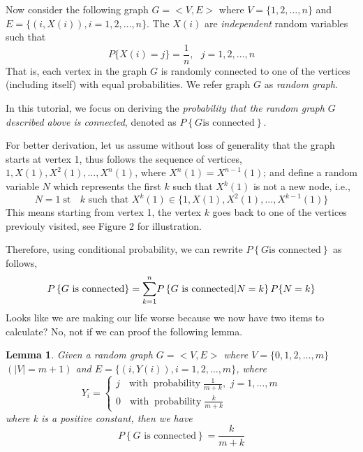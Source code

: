 \documentclass{IEEEconf}
\newcommand{\tmop}[1]{\ensuremath{\operatorname{#1}}}
\newcommand{\tmtextit}[1]{{\itshape{#1}}}
\newtheorem{lemma}{Lemma}
\begin{document}
Now consider the following graph $G = < V, E >$ where $V = \{ 1, 2, \ldots, n
\}$ and $E = \{ (i, X (i)), i = 1, 2, \ldots, n \}$. The $X (i)$ are
\tmtextit{independent} random variables such that
\[ P \{ X (i) = j \} = \frac{1}{n}, \text{ \ \ \ \ } j = 1, 2, \ldots, n \]
That is, each vertex in the graph $G$ is randomly connected to one of the
vertices (including itself) with equal probabilities. We refer graph $G$ as
\tmtextit{random graph}.

In this tutorial, we focus on deriving the \tmtextit{probability that the
random graph $G$ described above is connected}, denoted as $P \left\{ G \text{
is connected} \right\}$.

For better derivation, let us assume without loss of generality that the graph
starts at vertex 1, thus follows the sequence of vertices, $1, X (1), X^2 (1),
\ldots, X^n (1)$, where $X^n (1) = X^{n - 1} (1)$; and define a random
variable $N$ which represents the first $k$ such that $X^k (1)$ is not a new
node, i.e.,
\[ N = 1 \tmop{st} \text{ } k \text{ such that } X^k (1) \in \{ 1, X (1), X^2
   (1), \ldots, X^{k - 1} (1) \} \]
This means starting from vertex 1, the vertex $k$ goes back to one of the
vertices previouly visited, see Figure 2 for illustration.

Therefore, using conditional probability, we can rewrite $P \left\{ G \text{
is connected} \right\}$ as follows,
\begin{equation}
  P \left\{ G \text{ is connected} \right\} = {%
  \overset{n}{\underset{k = 1}{\sum}}} P \left\{ G \text{ is connected} |N = k
  \right\} P \{ N = k \} \label{decomp}
\end{equation}
Looks like we are making our life worse because we now have two items to
calculate? No, not if we can proof the following lemma.

\begin{lemma}
  Given a random graph $G = < V, E >$ where $V = \{ 0, 1, 2, \ldots, m \}$ $(|
  V | = m + 1)$ and $E = \{ (i, Y (i)), i = 1, 2, \ldots, m \}$, where
  \[ Y_i = \left\{ \begin{array}{l}
       j \text{ \ \ \ } \tmop{with} \tmop{probability} \frac{1}{m + k}, \text{
       } j = 1, \ldots, m\\
       0 \text{ \ \ \ } \tmop{with} \tmop{probability} \frac{k}{m + k}
     \end{array} \right. \]
  where k is a positive constant, then we have
  \[ P \left\{ G \text{ is connected} \right\} = \frac{k}{m + k} \]
\end{lemma}
\end{document}
